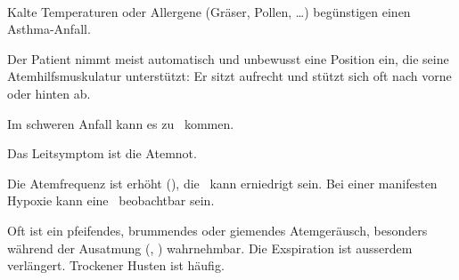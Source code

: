 



{\TxABCDE}
{~
\begin{ABCDEText}
  \item[\ABCDE{1}] Kalte Temperaturen oder Allergene
  (Gräser, Pollen, \ldots) begünstigen einen Asthma-Anfall.
  \item[\ABCDE{2}] Der Patient nimmt meist automatisch und unbewusst eine
  Position ein, die seine Atemhilfsmuskulatur unterstützt: Er
  sitzt aufrecht und stützt sich oft nach vorne oder hinten
  ab.
  \item[\ABCDE{3}] Im schweren Anfall kann es zu
  {\RedFlag}\, kommen.
  \item[\ABCDE{4}] Das Leitsymptom ist die Atemnot.
  \item[\ABCDE{B}] Die Atemfrequenz ist erhöht
  (), die {\RedFlag}\,
  kann erniedrigt sein. Bei einer manifesten Hypoxie kann eine
  {\RedFlag}\, beobachtbar sein.
  
  Oft ist ein pfeifendes,
  brummendes oder giemendes Atemgeräusch, besonders während
  der Ausatmung (, ) wahrnehmbar. Die Exspiration ist ausserdem
  verlängert. Trockener Husten ist häufig.
  
  

\end{ABCDEText}}
